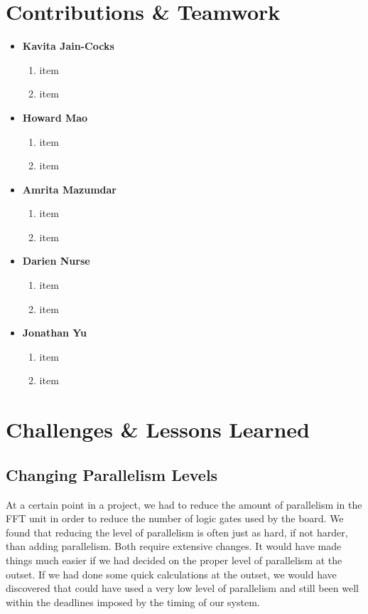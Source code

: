 \documentclass{article}
\begin{document}
\section{Contributions \& Teamwork}
	\begin{itemize}
	
	\item
	\textbf{Kavita Jain-Cocks}
		\begin{enumerate}
		\item item
		\item item
		\end{enumerate}
	
	\item 
	\textbf{Howard Mao}
		\begin{enumerate}
		\item item
		\item item
		\end{enumerate}
	
	\item 
	\textbf{Amrita Mazumdar}
		\begin{enumerate}
		\item item
		\item item
		\end{enumerate}
	
	\item 
	\textbf{Darien Nurse}
		\begin{enumerate}
		\item item
		\item item
		\end{enumerate}
	
	\item 
	\textbf{Jonathan Yu}
		\begin{enumerate}
		\item item
		\item item
		\end{enumerate}
	
	\end{itemize}

\section{Challenges \& Lessons Learned}

\subsection{Changing Parallelism Levels}

At a certain point in a project, we had to reduce the amount of parallelism in 
the FFT unit in order to reduce the number of logic gates used by the board. 
We found that reducing the level of parallelism is often just as hard, if not 
harder, than adding parallelism. Both require extensive changes. It would have 
made things much easier if we had decided on the proper level of parallelism 
at the outset. If we had done some quick calculations at the outset, we would 
have discovered that could have used a very low level of parallelism and still 
been well within the deadlines imposed by the timing of our system.
\end{document}
